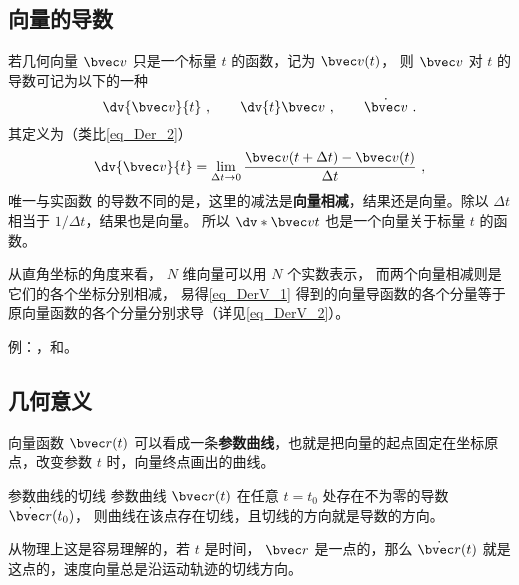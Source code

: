 
\begin{issues}
\end{issues}


\subsection{向量的导数}

若几何向量 $\bvec v$ 只是一个标量 $t$ 的函数，记为 $\bvec v(t)$， 则 $\bvec v$ 对 $t$ 的导数可记为以下的一种
\begin{equation}
\dv{\bvec v}{t}~, \qquad \dv{t}\bvec v~, \qquad \dot{\bvec v}~.
\end{equation}
其定义为（类比\autoref{eq_Der_2}）
\begin{equation}\label{eq_DerV_1}
\dv{\bvec v}{t} = \lim_{\Delta t \to 0} \frac{\bvec v ( t + \Delta t) - \bvec v(t)}{\Delta t}~,
\end{equation}
唯一与实函数  的导数不同的是，这里的减法是\textbf{向量相减}，结果还是向量。除以 $\Delta t$ 相当于 $1/\Delta t$，结果也是向量。 所以 $\dv*{\bvec v}{t}$ 也是一个向量关于标量 $t$ 的函数。

从直角坐标的角度来看， $N$ 维向量可以用 $N$ 个实数表示， 而两个向量相减则是它们的各个坐标分别相减， 易得\autoref{eq_DerV_1} 得到的向量导函数的各个分量等于原向量函数的各个分量分别求导（详见\autoref{eq_DerV_2}）。

例：，和。

\subsection{几何意义}
向量函数 $\bvec r(t)$ 可以看成一条\textbf{参数曲线}，也就是把向量的起点固定在坐标原点，改变参数 $t$ 时，向量终点画出的曲线。

\begin{theorem}{参数曲线的切线}
参数曲线 $\bvec r(t)$ 在任意 $t=t_0$ 处存在不为零的导数 $\dot{\bvec r}(t_0)$， 则曲线在该点存在切线，且切线的方向就是导数的方向。
\end{theorem}

从物理上这是容易理解的，若 $t$ 是时间， $\bvec r$ 是一点的，那么 $\dot{\bvec r}(t)$ 就是这点的，速度向量总是沿运动轨迹的切线方向。

